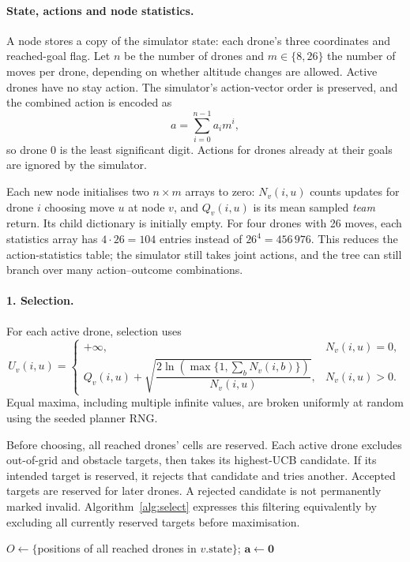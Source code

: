 \documentclass[11pt,a4paper]{article}
\begin{document}
\paragraph{State, actions and node statistics.}
A node stores a copy of the simulator state: each drone's three coordinates and reached-goal flag. Let $n$ be the number of drones and $m\in\{8,26\}$ the number of moves per drone, depending on whether altitude changes are allowed. Active drones have no stay action. The simulator's action-vector order is preserved, and the combined action is encoded as
\[
  a=\sum_{i=0}^{n-1} a_i m^i,
\]
so drone 0 is the least significant digit. Actions for drones already at their goals are ignored by the simulator.

Each new node initialises two $n\times m$ arrays to zero: $N_v(i,u)$ counts updates for drone $i$ choosing move $u$ at node $v$, and $Q_v(i,u)$ is its mean sampled \emph{team} return. Its child dictionary is initially empty. For four drones with 26 moves, each statistics array has $4\cdot26=104$ entries instead of $26^4=456\,976$. This reduces the action-statistics table; the simulator still takes joint actions, and the tree can still branch over many action--outcome combinations.

\paragraph{1. Selection.}
For each active drone, selection uses
\[
 U_v(i,u)=
 \begin{cases}
  +\infty, & N_v(i,u)=0,\\[2pt]
  Q_v(i,u)+\sqrt{\dfrac{2\ln\!\left(\max\{1,\sum_b N_v(i,b)\}\right)}{N_v(i,u)}},
      & N_v(i,u)>0.
 \end{cases}
\]
Equal maxima, including multiple infinite values, are broken uniformly at random using the seeded planner RNG.

Before choosing, all reached drones' cells are reserved. Each active drone excludes out-of-grid and obstacle targets, then takes its highest-UCB candidate. If its intended target is reserved, it rejects that candidate and tries another. Accepted targets are reserved for later drones. A rejected candidate is not permanently marked invalid. Algorithm~\ref{alg:select} expresses this filtering equivalently by excluding all currently reserved targets before maximisation.

\begin{algorithm}[H]
\small
\caption{\textsc{Select}$(v)$: per-drone UCB and sequential reservations}
\label{alg:select}
$O\leftarrow\{$positions of all reached drones in $v.\mathrm{state}\}$; $\mathbf{a}\leftarrow\mathbf{0}$\;
\;
\end{algorithm}
\end{document}
